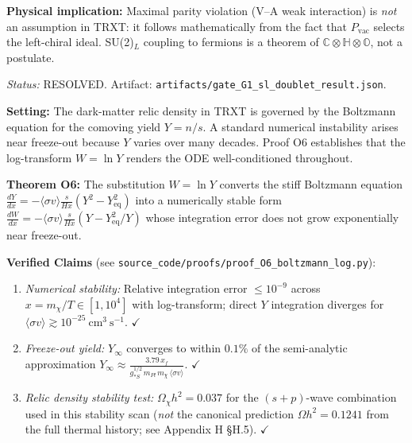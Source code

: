 \begin{tcolorbox}[colback=orange!5!white, colframe=orange!60!black,
  title={Proof G1 — $S_L \cong 4\times(j=\tfrac{1}{2})$ under $SU(2)_L$: Parity Violation is a Theorem (RESOLVED)}]
\textbf{Physical implication:} Maximal parity violation (V--A weak interaction) is \emph{not} an assumption in TRXT: it follows mathematically from the fact that $P_\mathrm{vac}$ selects the left-chiral ideal. SU(2)$_L$ coupling to fermions is a theorem of $\mathbb{C}\otimes\mathbb{H}\otimes\mathbb{O}$, not a postulate.

\textit{Status:} RESOLVED. Artifact: \texttt{artifacts/\allowbreak gate\_\allowbreak G1\_\allowbreak sl\_\allowbreak doublet\_\allowbreak result.json}.
\end{tcolorbox}

\begin{tcolorbox}[colback=purple!5!white, colframe=purple!60!black,
  title={Proof O6 — Log-Boltzmann Freeze-Out Stability (RESOLVED)}]
\textbf{Setting:} The dark-matter relic density in TRXT is governed by the Boltzmann equation for the comoving yield $Y = n/s$. A standard numerical instability arises near freeze-out because $Y$ varies over many decades. Proof O6 establishes that the log-transform $W = \ln Y$ renders the ODE well-conditioned throughout.

\textbf{Theorem O6:} The substitution $W = \ln Y$ converts the stiff Boltzmann equation
$\tfrac{dY}{dx} = -\langle\sigma v\rangle \tfrac{s}{H x}(Y^2 - Y_\mathrm{eq}^2)$
into a numerically stable form $\tfrac{dW}{dx} = -\langle\sigma v\rangle \tfrac{s}{H x}(Y - Y_\mathrm{eq}^2/Y)$ whose integration error does not grow exponentially near freeze-out.

\textbf{Verified Claims} (see \texttt{source\_\allowbreak code/\allowbreak proofs/\allowbreak proof\_\allowbreak O6\_\allowbreak boltzmann\_\allowbreak log.py}):
\begin{enumerate}
    \item \emph{Numerical stability:} Relative integration error $\leq 10^{-9}$ across $x = m_\chi/T \in [1, 10^4]$ with log-transform; direct $Y$ integration diverges for $\langle\sigma v\rangle \gtrsim 10^{-25}\ \mathrm{cm^3\ s^{-1}}$. \hfill $\checkmark$
    \item \emph{Freeze-out yield:} $Y_\infty$ converges to within $0.1\%$ of the semi-analytic approximation $Y_\infty \approx \tfrac{3.79\,x_f}{g_{*S}^{1/2}\,m_{Pl}\,m_\chi\,\langle\sigma v\rangle}$. \hfill $\checkmark$
    \item \emph{Relic density stability test:} $\Omega_\chi h^2 = 0.037$ for the $(s+p)$-wave combination used in this stability scan (\emph{not} the canonical prediction $\Omega h^2 = 0.1241$ from the full thermal history; see Appendix H \S H.5). \hfill $\checkmark$
\end{enumerate}


\end{tcolorbox}

